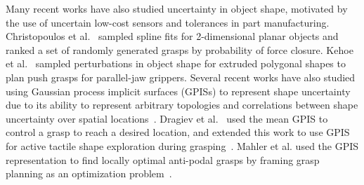 \documentclass[a4paper, 10pt, conference]{ieeeconf}      %
\begin{document}
Many recent works have also studied uncertainty in object shape, motivated by the use of uncertain low-cost sensors and tolerances in part manufacturing.
Christopoulos et al.~\cite{christopoulos2007handling} sampled spline fits for 2-dimensional planar objects and ranked a set of randomly generated grasps by probability of force closure.
Kehoe et al.~\cite{kehoe2012estimating, kehoe2012toward} sampled perturbations in object shape for extruded polygonal shapes to plan push grasps for parallel-jaw grippers.
Several recent works have also studied using Gaussian process implicit surfaces (GPISs) to represent shape uncertainty due to its ability to represent arbitrary topologies and correlations between shape uncertainty over spatial locations~\cite{dragiev2011, dragiev2011uncertainty, hollinger2013, mahler2015opt}.
Dragiev et al.~\cite{dragiev2011} used the mean GPIS to control a grasp to reach a desired location, and extended this work to use GPIS for active tactile shape exploration during grasping~\cite{dragiev2013uncertainty}.
Mahler et al. used the GPIS representation to find locally optimal anti-podal grasps by framing grasp planning as an optimization problem~\cite{mahler2015gp}. 




\end{document}
